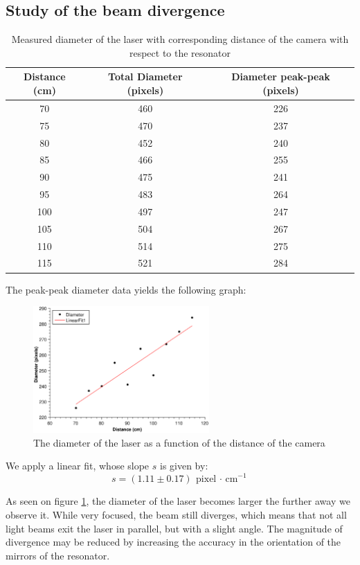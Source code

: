 \documentclass{scrartcl}
\begin{document}
\newpage
\subsection{Study of the beam divergence}
\begin{table}[!ht]
    \centering
    \begin{tabular}{c|c|c}
        Distance (cm) & Total Diameter (pixels) &  Diameter peak-peak (pixels)\\
        \hline
         70 & 460 & 226 \\
         75 & 470 & 237 \\
         80 & 452 & 240 \\
         85 & 466 & 255\\
         90 & 475 & 241 \\
         95 & 483 & 264 \\
         100 & 497 & 247 \\
         105 & 504 & 267 \\
         110 & 514 & 275 \\
         115 & 521 & 284
    \end{tabular}
    \caption{Measured diameter of the laser with corresponding distance of the camera with respect to the resonator}
    \label{tab:beamDiv}
\end{table}
\FloatBarrier

The peak-peak diameter data yields the following graph:
\begin{figure}[H]
    \centering
    \includegraphics[width=0.6\textwidth]{beam_div.eps}
    \caption{The diameter of the laser as a function of the distance of the camera}
    \label{fig:beam_div}
\end{figure}
We apply a linear fit, whose slope $s$ is given by:
\[s = (1.11 \pm 0.17) \ \text{pixel $\cdot$ cm}^{-1}\] 

As seen on figure \ref{fig:beam_div}, the diameter of the laser becomes larger the further away we observe it. While very focused, the beam still diverges, which means that not all light beams exit the laser in parallel, but with a slight angle. The magnitude of divergence may be reduced by increasing the accuracy in the orientation of the mirrors of the resonator.
\end{document}
